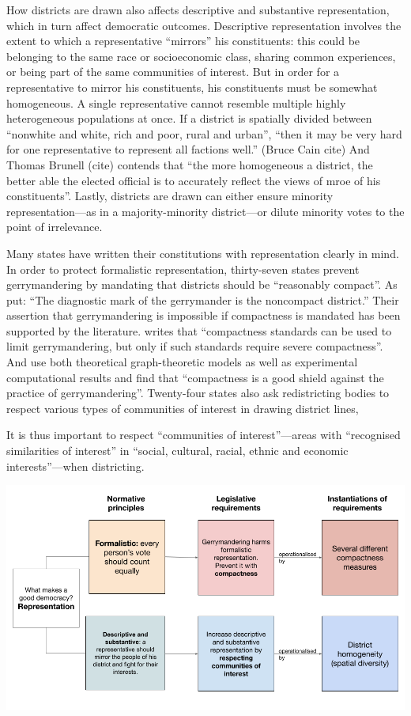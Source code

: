 \documentclass[]{article}
\begin{document}
How districts are drawn also affects descriptive and substantive
representation, which in turn affect democratic outcomes. Descriptive
representation involves the extent to which a representative ``mirrors''
his constituents: this could be belonging to the same race or
socioeconomic class, sharing common experiences, or being part of the
same communities of interest. But in order for a representative to
mirror his constituents, his constituents must be somewhat homogeneous.
A single representative cannot resemble multiple highly heterogeneous
populations at once. If a district is spatially divided between
``nonwhite and white, rich and poor, rural and urban'', ``then it may be
very hard for one representative to represent all factions well.''
(Bruce Cain cite) And Thomas Brunell (cite) contends that ``the more
homogeneous a district, the better able the elected official is to
accurately reflect the views of mroe of his constituents''. Lastly,
districts are drawn can either ensure minority representation---as in a
majority-minority district---or dilute minority votes to the point of
irrelevance.

Many states have written their constitutions with representation clearly
in mind. In order to protect formalistic representation, thirty-seven
states prevent gerrymandering by mandating that districts should be
``reasonably compact''. As \cite{pp1991} put: ``The diagnostic mark of
the gerrymander is the noncompact district.'' Their assertion that
gerrymandering is impossible if compactness is mandated has been
supported by the literature. \cite{altman1998} writes that ``compactness
standards can be used to limit gerrymandering, but only if such
standards require severe compactness''. And \cite{apollonio2006} use
both theoretical graph-theoretic models as well as experimental
computational results and find that ``compactness is a good shield
against the practice of gerrymandering''. Twenty-four states also ask
redistricting bodies to respect various types of communities of interest
in drawing district lines,

It is thus important to respect ``communities of interest''---areas with
``recognised similarities of interest'' in ``social, cultural, racial,
ethnic and economic interests''---when districting.

\includegraphics{./img/why_compactness_and_community1.png}
\end{document}
